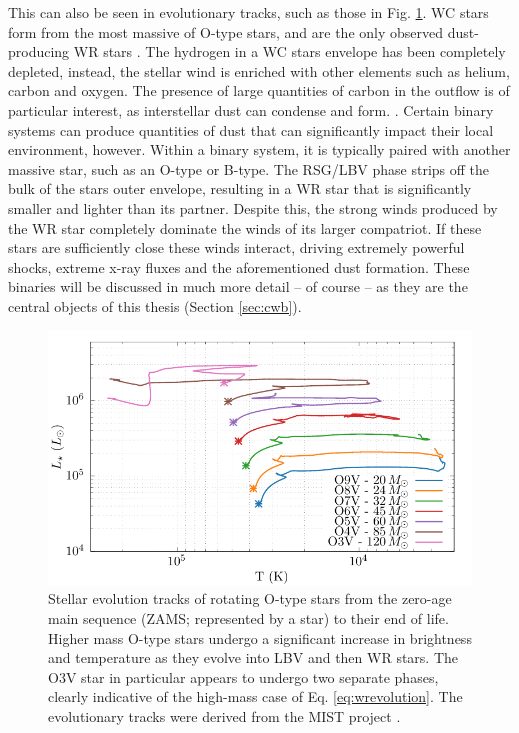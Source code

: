 \noindent
This can also be seen in evolutionary tracks, such as those in Fig. \ref{fig:mist-zams}.
WC stars form from the most massive of O-type stars, and are the only observed dust-producing WR stars \parencite{rossloweSpatialDistributionGalactic2015}.
The hydrogen in a WC stars envelope has been completely depleted, instead, the stellar wind is enriched with other elements such as helium, carbon and oxygen.
The presence of large quantities of carbon in the outflow is of particular interest, as interstellar dust can condense and form.
.
Certain binary systems can produce quantities of dust that can significantly impact their local environment, however.
Within a binary system, it is typically paired with another massive star, such as an O-type or B-type.
The RSG/LBV phase strips off the bulk of the stars outer envelope, resulting in a WR star that is significantly smaller and lighter than its partner.
Despite this, the strong winds produced by the WR star completely dominate the winds of its larger compatriot.
If these stars are sufficiently close these winds interact, driving extremely powerful shocks, extreme x-ray fluxes and the aforementioned dust formation.
These binaries will be discussed in much more detail -- of course -- as they are the central objects of this thesis (Section \ref{sec:cwb}).

\begin{figure}[ht]
  \centering
  \includegraphics{assets/tracks/tracks.pdf}
  \caption[Stellar evolution tracks of massive stars]{Stellar evolution tracks of rotating O-type stars from the zero-age main sequence (ZAMS; represented by a star) to their end of life. Higher mass O-type stars undergo a significant increase in brightness and temperature as they evolve into LBV and then WR stars. The O3V star in particular appears to undergo two separate phases, clearly indicative of the high-mass case of Eq. \ref{eq:wrevolution}. The evolutionary tracks were derived from the MIST project \parencite{choiMesaIsochronesStellar2016,dotterMESAIsochronesStellar2016,paxtonModulesExperimentsStellar2011}.}
  \label{fig:mist-zams}
\end{figure}

